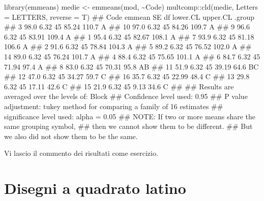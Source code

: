 \documentclass[a4paper,12pt,oneside]{book}
\newenvironment{Shaded}{\begin{snugshade}}{\end{snugshade}}
\newcommand{\SpecialCharTok}[1]{#1}
\newcommand{\DocumentationTok}[1]{#1}
\newcommand{\OtherTok}[1]{#1}
\newcommand{\FunctionTok}[1]{#1}
\newcommand{\AttributeTok}[1]{#1}
\newcommand{\AlertTok}[1]{#1}
\newcommand{\NormalTok}[1]{#1}
\begin{document}
\begin{Shaded}
\begin{Highlighting}[]
\FunctionTok{library}\NormalTok{(emmeans)}
\NormalTok{medie }\OtherTok{\textless{}{-}} \FunctionTok{emmeans}\NormalTok{(mod, }\SpecialCharTok{\textasciitilde{}}\NormalTok{Code)}
\NormalTok{multcomp}\SpecialCharTok{::}\FunctionTok{cld}\NormalTok{(medie, }\AttributeTok{Letters =}\NormalTok{ LETTERS, }\AttributeTok{reverse =}\NormalTok{ T)}
\DocumentationTok{\#\#  Code emmean   SE df lower.CL upper.CL .group}
\DocumentationTok{\#\#  3      98.0 6.32 45    85.24    110.7  A    }
\DocumentationTok{\#\#  10     97.0 6.32 45    84.26    109.7  A    }
\DocumentationTok{\#\#  9      96.6 6.32 45    83.91    109.4  A    }
\DocumentationTok{\#\#  1      95.4 6.32 45    82.67    108.1  A    }
\DocumentationTok{\#\#  7      93.9 6.32 45    81.18    106.6  A    }
\DocumentationTok{\#\#  2      91.6 6.32 45    78.84    104.3  A    }
\DocumentationTok{\#\#  5      89.2 6.32 45    76.52    102.0  A    }
\DocumentationTok{\#\#  14     89.0 6.32 45    76.24    101.7  A    }
\DocumentationTok{\#\#  4      88.4 6.32 45    75.65    101.1  A    }
\DocumentationTok{\#\#  6      84.7 6.32 45    71.94     97.4  A    }
\DocumentationTok{\#\#  8      83.0 6.32 45    70.31     95.8  AB   }
\DocumentationTok{\#\#  11     51.9 6.32 45    39.19     64.6   BC  }
\DocumentationTok{\#\#  12     47.0 6.32 45    34.27     59.7    C  }
\DocumentationTok{\#\#  16     35.7 6.32 45    22.99     48.4    C  }
\DocumentationTok{\#\#  13     29.8 6.32 45    17.11     42.6    C  }
\DocumentationTok{\#\#  15     21.9 6.32 45     9.13     34.6    C  }
\DocumentationTok{\#\# }
\DocumentationTok{\#\# Results are averaged over the levels of: Block }
\DocumentationTok{\#\# Confidence level used: 0.95 }
\DocumentationTok{\#\# P value adjustment: tukey method for comparing a family of 16 estimates }
\DocumentationTok{\#\# significance level used: alpha = 0.05 }
\DocumentationTok{\#\# }\AlertTok{NOTE}\DocumentationTok{: If two or more means share the same grouping symbol,}
\DocumentationTok{\#\#       then we cannot show them to be different.}
\DocumentationTok{\#\#       But we also did not show them to be the same.}
\end{Highlighting}
\end{Shaded}

\normalsize

Vi lascio il commento dei risultati come esercizio.

\hypertarget{disegni-a-quadrato-latino-1}{%
\section{Disegni a quadrato latino}\label{disegni-a-quadrato-latino-1}}
\end{document}
